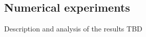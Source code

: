 \documentclass[11pt]{article}
\numberwithin{equation}{section}
\begin{document}
\subsection{Numerical experiments}
Description and analysis of the results TBD


\FloatBarrier
\end{document}
